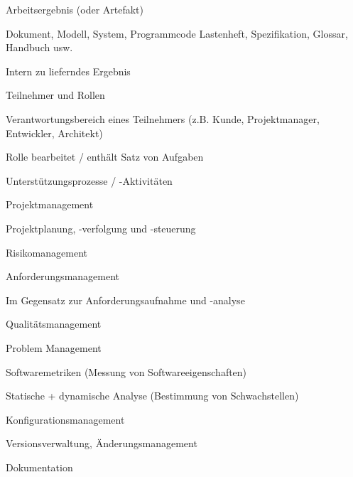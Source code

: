 \documentclass[a4paper]{article}
\begin{document}
\begin{multicols}{3}
  Arbeitsergebnis (oder Artefakt)
  \begin{itemize*}
    \item Dokument, Modell, System, Programmcode Lastenheft, Spezifikation, Glossar, Handbuch usw.
    \item Intern zu lieferndes Ergebnis
  \end{itemize*}

  Teilnehmer und Rollen
  \begin{itemize*}
    \item Verantwortungsbereich eines Teilnehmers (z.B. Kunde, Projektmanager, Entwickler, Architekt)
    \item Rolle bearbeitet / enthält Satz von Aufgaben
  \end{itemize*}

  Unterstützungsprozesse / -Aktivitäten
  \begin{itemize*}
    \item Projektmanagement
          \begin{itemize*}
            \item Projektplanung, -verfolgung und -steuerung
            \item Risikomanagement
          \end{itemize*}
    \item Anforderungsmanagement
          \begin{itemize*}
            \item Im Gegensatz zur Anforderungsaufnahme und -analyse
          \end{itemize*}
    \item Qualitätsmanagement
          \begin{itemize*}
            \item Problem Management
            \item Softwaremetriken (Messung von Softwareeigenschaften)
            \item Statische + dynamische Analyse (Bestimmung von Schwachstellen)
          \end{itemize*}
    \item Konfigurationsmanagement
          \begin{itemize*}
            \item Versionsverwaltung, Änderungsmanagement
          \end{itemize*}
    \item Dokumentation
  \end{itemize*}


\end{multicols}
\end{document}
